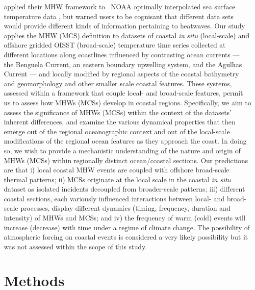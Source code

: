 \documentclass[a4paper,10pt,review]{elsarticle}
\begin{document}
\citet{Hobday2016} applied their MHW framework to \degree~NOAA optimally interpolated sea surface temperature data \citep[hereafter referred to as OISST;][]{Reynolds2007}, but warned users to be cognisant that different data sets would provide different kinds of information pertaining to heatwaves. Our study applies the MHW (MCS) definition to datasets of coastal \emph{in situ} (local-scale) and offshore gridded OISST (broad-scale) temperature time series collected at different locations along coastlines influenced by contrasting ocean currents --- the Benguela Current, an eastern boundary upwelling system, and the Agulhas Current --- and locally modified by regional aspects of the coastal bathymetry and geomorphology and other smaller scale coastal features. These systems, assessed within a framework that couple local- and broad-scale features, permit us to assess how MHWs (MCSs) develop in coastal regions. Specifically, we aim to assess the significance of MHWs (MCSs) within the context of the datasets’ inherent differences, and examine the various dynamical properties that then emerge out of the regional oceanographic context and out of the local-scale modifications of the regional ocean features as they approach the coast. In doing so, we wish to provide a mechanistic understanding of the nature and origin of MHWs (MCSs) within regionally distinct ocean/coastal sections. Our predictions are that i) local coastal MHW events are coupled with offshore broad-scale thermal patterns; ii) MCSs originate at the local scale in the coastal \emph{in situ} dataset as isolated incidents decoupled from broader-scale patterns; iii) different coastal sections, each variously influenced interactions between local- and broad-scale processes, display different dynamics (timing, frequency, duration and intensity) of MHWs and MCSs; and iv) the frequency of warm (cold) events will increase (decrease) with time under a regime of climate change. The possibility of atmospheric forcing on coastal events is considered a very likely possibility but it was not assessed within the scope of this study.

\section{Methods}
\end{document}
